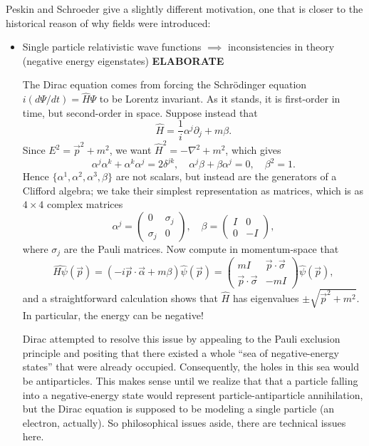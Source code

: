 \documentclass{report}
\theoremstyle{plain}
\theoremstyle{definition}
\theoremstyle{remark}
\newcommand{\elaborate}{{\color{blue} \textbf{ELABORATE}}}
\begin{document}
    Peskin and Schroeder give a slightly different motivation, one that is
    closer to the historical reason of why fields were introduced:
    \begin{itemize}
        \item Single particle relativistic wave functions $\implies$
            inconsistencies in theory (negative energy eigenstates)
            \elaborate

            The Dirac equation comes from forcing the Schr\"odinger
            equation $i(d\Psi/dt) = \hat{H}\Psi$ to be Lorentz
            invariant. As it stands, it is first-order in time, but
            second-order in space. Suppose instead that
            $$ \hat{H} = \frac{1}{i} \alpha^j \partial_j + m\beta. $$
            Since $E^2 = \vec{p}^2 + m^2$, we want $\hat{H}^2 =
            -\nabla^2 + m^2$, which gives
            $$ \alpha^j \alpha^k + \alpha^k \alpha^j = 2\delta^{jk},
            \quad \alpha^j \beta + \beta \alpha^j = 0, \quad \beta^2 =
            1. $$ Hence $\{\alpha^1, \alpha^2, \alpha^3, \beta\}$ are
            not scalars, but instead are the generators of a Clifford
            algebra; we take their simplest representation as
            matrices, which is as $4 \times 4$ complex matrices
            $$ \alpha^j = \begin{pmatrix} 0 & \sigma_j \\ \sigma_j &
              0 \end{pmatrix}, \quad \beta = \begin{pmatrix} I & 0
              \\ 0 & -I \end{pmatrix}, $$ where $\sigma_j$ are the
            Pauli matrices. Now compute in momentum-space that
            $$ \widehat{H\psi}(\vec{p}) = (-i \vec{p} \cdot
            \vec{\alpha} + m\beta) \hat{\psi}(\vec{p})
            = \begin{pmatrix} mI & \vec{p} \cdot \vec{\sigma}
              \\ \vec{p} \cdot \vec{\sigma} & -mI \end{pmatrix}
            \hat{\psi}(\vec{p}), $$ and a straightforward calculation
            shows that $\hat{H}$ has eigenvalues $\pm \sqrt{\vec{p}^2
              + m^2}$. In particular, the energy can be negative!

            Dirac attempted to resolve this issue by appealing to the
            Pauli exclusion principle and positing that there existed
            a whole ``sea of negative-energy states'' that were
            already occupied. Consequently, the holes in this sea
            would be antiparticles. This makes sense until we realize
            that that a particle falling into a negative-energy state
            would represent particle-antiparticle annihilation, but
            the Dirac equation is supposed to be modeling a single
            particle (an electron, actually). So philosophical issues
            aside, there are technical issues here.
            

\end{itemize}
\end{document}
